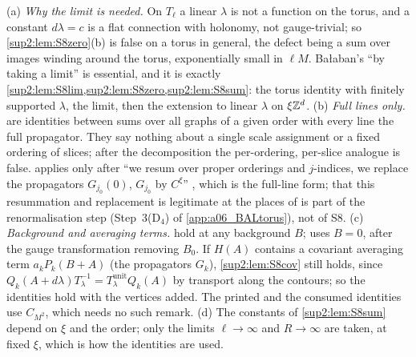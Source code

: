 \begin{remark}\label{sup2:rem:S8scope}
\textup{(a)} \emph{Why the limit is needed.} On $T_\ell$ a linear $\lambda$ is not a function on the torus, and a constant $d\lambda=c$ is a flat connection with holonomy, not gauge-trivial; so \cref{sup2:lem:S8zero}(b) is false on a torus in general, the defect being a sum over images winding around the torus, exponentially small in $\ell M$. Ba{\l}aban's ``by taking a limit'' is essential, and it is exactly \cref{sup2:lem:S8lim,sup2:lem:S8zero,sup2:lem:S8sum}: the torus identity with finitely supported $\lambda$, the limit, then the extension to linear $\lambda$ on $\xi\mathbb Z^d$.
\textup{(b)} \emph{Full lines only.}  are identities between sums over all graphs of a given order with every line the full propagator. They say nothing about a single scale assignment or a fixed ordering of slices; after the decomposition \cite[(2.6)]{Ba3} the per-ordering, per-slice analogue is false. \cite{Ba3} applies \cite[(2.26)]{Ba3} only after ``we resum over proper orderings and $j$-indices, we replace the propagators $G_{j_0}(0)$, $G_{j_0}$ by $C^\xi$'' \cite[p.~442]{Ba3}, which is the full-line form; that this resummation and replacement is legitimate at the places of \cite[Sect.~3]{Ba3} is part of the renormalisation step (Step~3(D$_4$) of \cref{app:a06_BALtorus}), not of S8.
\textup{(c)} \emph{Background and averaging terms.}  hold at any background $B$; \cite{Ba3} uses $B=0$, after the gauge transformation removing $B_0$. If $H(A)$ contains a covariant averaging term $a_kP_k(B+A)$ (the propagators $G_k$), \cref{sup2:lem:S8cov} still holds, since $Q_k(A+d\lambda)T_\lambda^{-1}=T^{\mathrm{unit}}_\lambda Q_k(A)$ by transport along the contours; so the identities hold with the vertices \cite[(1.13)--(1.15)]{Ba3} added. The printed and the consumed identities use $C_{M^2}$, which needs no such remark. \textup{(d)} The constants of \cref{sup2:lem:S8sum} depend on $\xi$ and the order; only the limits $\ell\to\infty$ and $R\to\infty$ are taken, at fixed $\xi$, which is how the identities are used.
\end{remark}
